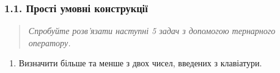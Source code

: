 \documentclass[]{article}
\begin{document}
\subsubsection{1.1. Прості умовні
конструкції}\label{ux43fux440ux43eux441ux442ux456-ux443ux43cux43eux432ux43dux456-ux43aux43eux43dux441ux442ux440ux443ux43aux446ux456ux457}

\begin{quote}
\emph{Спробуйте розв'язати наступні 5 задач з допомогою тернарного
оператору.}
\end{quote}

\begin{enumerate}
\def\labelenumi{\arabic{enumi})}
\item
  Визначити більше та менше з двох чисел, введених з клавіатури.
\end{enumerate}
\end{document}
